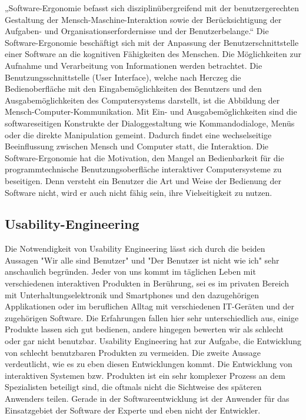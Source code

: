 \documentclass[a4paper, 12pt, twoside, BCOR=20mm, DIV=calc, abstracton, parskip=half*, toc=bibliography, toc=listof, headsepline, footsepline, headings=small, numbers=enddot]{scrreprt}
\begin{document}
	„Software-Ergonomie befasst sich disziplinübergreifend mit der benutzergerechten Gestaltung der Mensch-Maschine-Interaktion sowie der Berücksichtigung der Aufgaben- und Organisationserfordernisse und der Benutzerbelange.“ \cite[S. 7]{zeidler1992software}
	Die Software-Ergonomie beschäftigt sich mit der Anpassung der Benutzerschnittstelle einer Software an die kognitiven Fähigkeiten des Menschen. Die Möglichkeiten zur Aufnahme und Verarbeitung von Informationen werden betrachtet. Die Benutzungsschnittstelle (User Interface), welche nach Herczeg\cite{herczeg2005software} die Bedienoberfläche mit den Eingabemöglichkeiten des Benutzers und den Ausgabemöglichkeiten des Computersystems darstellt, ist die Abbildung der Mensch-Computer-Kommunikation. 
	Mit Ein- und Ausgabemöglichkeiten sind die softwareseitigen Konstrukte der Dialoggestaltung wie Kommandodialoge, Menüs oder die direkte Manipulation gemeint. Dadurch findet eine wechselseitige Beeinflussung zwischen Mensch und Computer statt, die Interaktion.
	Die Software-Ergonomie hat die Motivation, den Mangel an Bedienbarkeit für die programmtechnische Benutzungsoberfläche interaktiver Computersysteme zu beseitigen. Denn versteht ein Benutzer die Art und Weise der Bedienung der Software nicht, wird er auch nicht fähig sein, ihre Vielseitigkeit zu nutzen.
	
	\subsection{Usability-Engineering}

Die Notwendigkeit von Usability Engineering lässt sich durch die beiden Aussagen "Wir alle sind Benutzer" und "Der Benutzer ist nicht wie ich" \cite{richter2010usability} sehr anschaulich begründen. Jeder von uns kommt im täglichen Leben mit verschiedenen interaktiven Produkten in Berührung, sei es im privaten Bereich mit Unterhaltungselektronik und Smartphones und den dazugehörigen Applikationen oder im beruflichen Alltag mit verschiedenen IT-Geräten und der zugehörigen Software. Die Erfahrungen fallen hier sehr unterschiedlich aus, einige Produkte lassen sich gut bedienen, andere hingegen bewerten wir als schlecht oder gar nicht benutzbar. Usability Engineering hat zur Aufgabe, die Entwicklung von schlecht benutzbaren Produkten zu vermeiden. Die zweite Aussage verdeutlicht, wie es zu eben diesen Entwicklungen kommt. Die Entwicklung von interaktiven Systemen bzw. Produkten ist ein sehr komplexer Prozess an dem Spezialisten beteiligt sind, die oftmals nicht die Sichtweise des späteren Anwenders teilen. Gerade in der Softwareentwicklung ist der Anwender für das Einsatzgebiet der Software der Experte und eben nicht der Entwickler\cite[vgl. S. 1ff]{richter2010usability}. 
		
\end{document}
